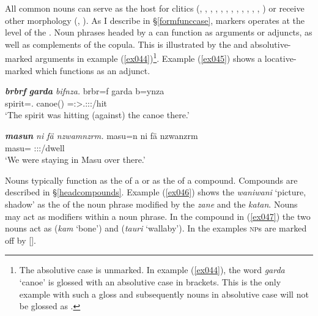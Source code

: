 All common nouns can serve as the host for  clitics (, , , , , , , , , , , , ) or receive other  morphology (, ). As I describe in \S{}\ref{formfunccase},  markers operates at the level of the . Noun phrases headed by a  can function as arguments or adjuncts, as well as complements of the copula. This is illustrated by the  and absolutive-marked arguments in example (\ref{ex044})\footnote{The absolutive case is unmarked. In example (\ref{ex044}), the word \emph{garda} `canoe' is glossed with an absolutive case in brackets. This is the only example with such a gloss and subsequently nouns in absolutive case will not be glossed as \Abs.}. Example (\ref{ex045}) shows a locative-marked  which functions as an adjunct.

\begin{exe}
	\ex \emph{\textbf{brbrf} \textbf{garda} bifnza.}
	\gll brbr=f garda b=ynza\\
	spirit=\Erg.\Sg{} canoe(\Abs{}) \Med=\Stsg:\Sbj>\Tsg.\Masc:\Obj:\Pst:\Ipfv/hit\\
	\trans `The spirit was hitting (against) the canoe there.'
	\label{ex044}
\end{exe}
\begin{exe}
	\ex \emph{\textbf{masun} ni fä nzwamnzrm.}
	\gll masu=n ni fä nzwanzrm\\
	masu=\Loc{} \Fnsg{} \Dist{} \Fpl:\Sbj:\Pst:\Dur/dwell\\
	\trans `We were staying in Masu over there.'
	\label{ex045}
\end{exe}

Nouns typically function as the  of a  or as the  of a  compound. Compounds are described in \S{}\ref{headcompounds}. Example (\ref{ex046}) shows the  \emph{waniwani} `picture, shadow' as the  of the noun phrase modified by the  \emph{zane} and the  \emph{katan}. Nouns may act as modifiers within a noun phrase. In the  compound in (\ref{ex047}) the two nouns act as  (\emph{kam} `bone') and  (\emph{tauri} `wallaby'). In the examples \textsc{np}s are marked off by [].

